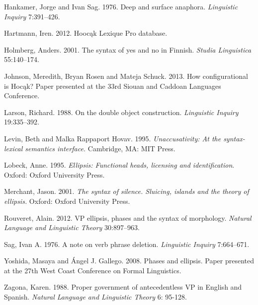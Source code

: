\documentclass[output=paper]{LSP/langsci}
\begin{document}
\begin{reflist}
Hankamer, Jorge and Ivan Sag. 1976. Deep and surface anaphora. \emph{Linguistic Inquiry} 7:391--426.

Hartmann, Iren. 2012. Hooc\k{a}k Lexique Pro database.

Holmberg, Anders. 2001. The syntax of yes and no in Finnish. \emph{Studia Linguistica} 55:140--174.

Johnson, Meredith, Bryan Rosen and Mateja Schuck. 2013. How configurational is Hoc\k{a}k? Paper presented at the 33rd Siouan and Caddoan Languages Conference.

Larson, Richard. 1988. On the double object construction. \emph{Linguistic Inquiry} 19:335--392.

Levin, Beth and Malka Rappaport Hovav. 1995. \emph{Unaccusativity: At the syntax-lexical semantics interface.} Cambridge, MA: MIT Press.

Lobeck, Anne. 1995. \emph{Ellipsis: Functional heads, licensing and identification}. Oxford: Oxford University Press.

Merchant, Jason. 2001. \emph{The syntax of silence. Sluicing, islands and the theory of ellipsis.} Oxford: Oxford University Press.

Rouveret, Alain. 2012. VP ellipsis, phases and the syntax of morphology. \emph{Natural Language and Linguistic Theory} 30:897--963. 

Sag, Ivan A. 1976. A note on verb phrase deletion. \emph{Linguistic Inquiry} 7:664--671.

Yoshida, Masaya and \'{A}ngel J. Gallego. 2008. Phases and ellipsis. Paper presented at the 27th West Coast Conference on Formal Linguistics.

Zagona, Karen. 1988. Proper government of antecedentless VP in English and Spanish. \emph{Natural Language and Linguistic Theory} 6: 95-128.

\end{reflist}
\end{document}
